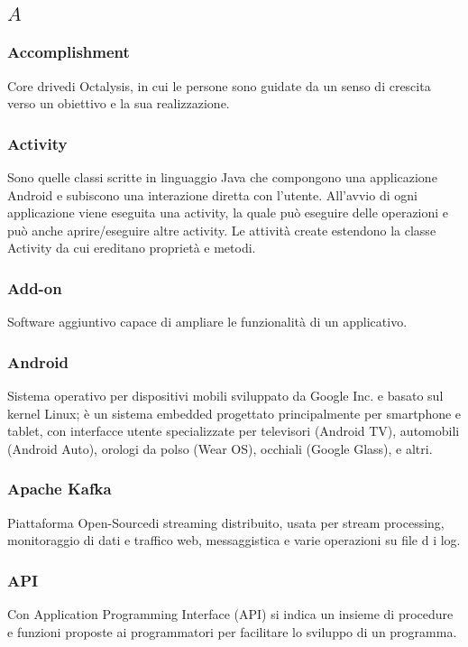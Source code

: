 \subsection*{\quad$A\quad$}
\subsubsection*{Accomplishment}
Core drive\glosp di Octalysis\glo, in cui le persone sono guidate da un senso di crescita verso un obiettivo e la sua realizzazione.

\subsubsection*{Activity}
Sono quelle classi scritte in linguaggio Java che compongono una applicazione Android e subiscono una interazione diretta con l'utente. All'avvio di ogni applicazione viene eseguita una activity, la quale può eseguire delle operazioni e può anche aprire/eseguire altre activity. Le attività create estendono la classe Activity da cui ereditano proprietà e metodi.

\subsubsection*{Add-on}
Software aggiuntivo capace di ampliare le funzionalità di un applicativo.

\subsubsection*{Android}
Sistema operativo per dispositivi mobili sviluppato da Google Inc. e basato sul kernel Linux; è un sistema embedded progettato principalmente per smartphone e tablet, con interfacce utente specializzate per televisori (Android TV), automobili (Android Auto), orologi da polso (Wear OS), occhiali (Google Glass), e altri.

\subsubsection*{Apache Kafka}
Piattaforma Open-Source\glosp di streaming distribuito, usata per stream processing, monitoraggio di dati e traffico web, messaggistica e varie operazioni su file d i log.

\subsubsection*{API}
Con Application Programming Interface (API) si indica un insieme di procedure e funzioni proposte ai programmatori per facilitare lo sviluppo di un programma.

